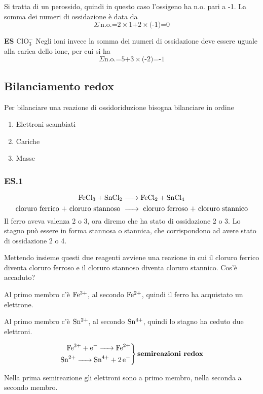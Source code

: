 \vspace{0.2cm}Si tratta di un perossido, quindi in questo caso l'ossigeno ha n.o. pari a -1. La somma dei numeri di ossidazione è data da\\
$$\Sigma\,\text{n.o.=2} \times \text{1+2} \times \text{(-1)=0}$$

\textbf{ES} ClO$_3^-$
Negli ioni invece la somma dei numeri di ossidazione deve essere uguale alla carica dello ione, per cui si ha
$$\Sigma \text{n.o.=5+3} \times \text{(-2)=-1}$$
\subsection{Bilanciamento redox}
Per bilanciare una reazione di ossidoriduzione bisogna bilanciare in ordine
\begin{enumerate}
    \item Elettroni scambiati
    \item Cariche
    \item Masse
  \end{enumerate}
\subsubsection{\textbf{ES.1}}
$$\ce{FeCl_3 + SnCl_2 -> FeCl_2 + SnCl_4}$$
$$\text{cloruro ferrico + cloruro stannoso \ce{->} cloruro ferroso + cloruro stannico}$$
Il ferro aveva valenza 2 o 3, ora diremo che ha stato di ossidazione 2 o 3. Lo stagno può essere in forma stannosa o stannica, che corrispondono ad avere stato di ossidazione 2 o 4.

Mettendo insieme questi due reagenti avviene una reazione in cui il cloruro ferrico diventa cloruro ferroso e il cloruro stannoso diventa cloruro stannico. Cos'è accaduto?

Al primo membro c'è $\rm Fe^{3+}$, al secondo $\rm Fe^{2+}$, quindi il ferro ha acquistato un elettrone.

Al primo membro c'è $\rm Sn^{2+}$, al secondo $\rm Sn^{4+}$, quindi lo stagno ha ceduto due elettroni.

\begin{equation*}
  \left.\begin{aligned}
  \ce{Fe^{3+} + e^- -> Fe^{2+}}\\
  \ce{Sn^{2+} -> Sn^{4+} + 2 e^-}
\end{aligned}\right\} \textbf{semireazioni redox}
\end{equation*}

Nella prima semireazione gli elettroni sono a primo membro, nella seconda a secondo membro.

